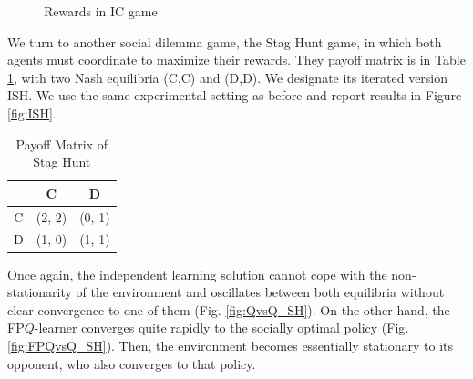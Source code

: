 \begin{figure}
%
%
\caption{Rewards in IC game}\label{fig:IC}

\end{figure}

We turn to another social dilemma game, the Stag Hunt game, in which both agents must coordinate 
to maximize their rewards. They payoff matrix is in Table \ref{tab:payoffSG}, with
two Nash equilibria (C,C) and (D,D). We designate its iterated version ISH. We use the same experimental setting as before and report results in Figure \ref{fig:ISH}. 

\begin{table}[h!]
\begin{center}
\begin{tabular}{c|c|c}
\hline
 & C & D \\
\hline
C & (2, 2) & (0, 1) \\
\hline
D & (1, 0) & (1, 1)  \\
\hline
\end{tabular}
\end{center}
\caption{Payoff Matrix of Stag Hunt}
\label{tab:payoffSG}
\vspace{-2ex}
\end{table}
\noindent Once again, the independent learning solution cannot
cope with the non-stationarity of the environment and oscillates between both
equilibria  without clear convergence to one of 
them (Fig. \ref{fig:QvsQ_SH}). On the other hand, the FP$Q$-learner converges quite rapidly to the socially optimal policy (Fig. \ref{fig:FPQvsQ_SH}). Then, the environment becomes
essentially stationary to its opponent, who also converges to that policy.


